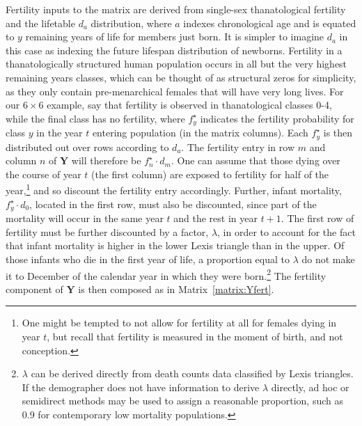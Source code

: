 \documentclass{article}
\begin{document}
 Fertility inputs to the matrix are derived from single-sex thanatological
 fertility and the lifetable $d_a$ distribution, where $a$ indexes
 chronological age and is equated to $y$ remaining years of life for members
 just born. It is simpler to imagine $d_a$ in this case as indexing the
 future lifespan distribution of newborns. Fertility in a thanatologically
 structured human population occurs in all but the very highest remaining years classes, which can be thought of as structural zeros for simplicity, as they only contain pre-menarchical females
 that will have very long lives.
 For our $6\times 6$ example, say that fertility is observed in
 thanatological classes 0-4, while the final class has no fertility, where
 $f^\star_y$ indicates the fertility probability for class $y$ in the year $t$
 entering population (in the matrix columns). Each $f^\star_y$ is then
 distributed out over rows according to $d_a$.
 The fertility entry in row $m$ and column $n$ of $\textbf{Y}$ will therefore be
 $f^\star_n \cdot d_m$. One can assume that those dying over the course of year
 $t$ (the first column) are exposed to fertility for half of the year,\footnote{One might be tempted to not allow for fertility at all for females dying in year $t$, but recall that fertility is measured in the moment of
 birth, and not conception.} and so discount the fertility entry
 accordingly.
 Further, infant mortality, $f^\star_y \cdot d_0$, located in the first row, must also be discounted, since part
 of the mortality will occur in the same year $t$ and the rest in year $t + 1$. 
 The first row of fertility must be further discounted by a factor, $\lambda$,
 in order to account for the fact that infant mortality is higher in the lower Lexis 
 triangle than in the upper. Of those infants who die in the first year of life,
 a proportion equal to $\lambda$ do not make it to December  of the calendar year in which
 they were born.\footnote{$\lambda$ can be derived directly from death counts
 data classified by Lexis triangles. If the demographer
 does not have information to derive $\lambda$ directly, ad hoc or semidirect
 methods may be used to assign a reasonable proportion, such as 0.9 for
 contemporary low mortality populations.} The fertility component of $\textbf{Y}$ is then composed as in Matrix~\ref{matrix:Yfert}.
\end{document}
